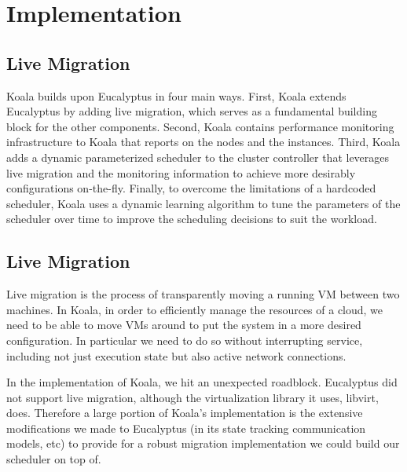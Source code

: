 \section{Implementation}
\label{sec:impl}

\subsection{Live Migration}

Koala builds upon Eucalyptus in four main ways.  First, Koala extends
Eucalyptus by adding live migration, which serves as a fundamental building
block for the other components.  Second, Koala contains performance monitoring
infrastructure to Koala that reports on the nodes and the instances. Third,
Koala adds a dynamic parameterized scheduler to the cluster controller that
leverages live migration and the monitoring information to achieve more
desirably configurations on-the-fly.  Finally, to overcome the limitations of a
hardcoded scheduler, Koala uses a dynamic learning algorithm to tune the
parameters of the scheduler over time to improve the scheduling decisions to
suit the workload.


\subsection{Live Migration}
Live migration is the process of transparently moving a running VM between two
machines.  In Koala, in order to efficiently manage the resources of a cloud,
we need to be able to move VMs around to put the system in a more desired
configuration. In particular we need to do so without interrupting service,
including not just execution state but also active network connections.

In the implementation of Koala, we hit an unexpected roadblock.  Eucalyptus did
not support live migration, although the virtualization library it uses,
libvirt, does.  Therefore a large portion of Koala's implementation is the
extensive modifications we made to Eucalyptus (in its state tracking
communication models, etc) to provide for a robust migration implementation we
could build our scheduler on top of.

